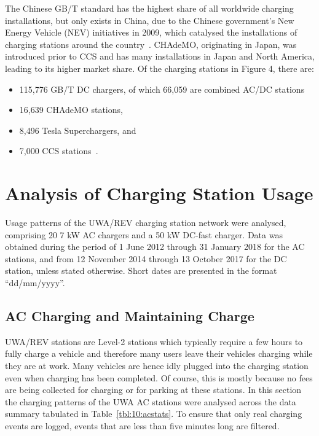 The Chinese GB/T standard has the highest share of all worldwide charging installations, but only exists in China, due to the Chinese government’s New Energy Vehicle (NEV) initiatives in 2009, which catalysed the installations of charging stations around the country~\cite{ji_plug-electric_2018}. CHAdeMO, originating in Japan, was introduced prior to CCS and has many installations in Japan and North America, leading to its higher market share. Of the charging stations in Figure 4, there are:
\begin{itemize}
	\item 115,776 GB/T DC chargers, of which 66,059 are combined AC/DC stations~\cite{china_electric_vehicle_charging_infrastructure_promotion_alliance_zhongguo_2017}
	\item 16,639 CHAdeMO stations,
	\item 8,496 Tesla Superchargers, and
	\item 7,000 CCS stations~\cite{steitz_plug_2018}.
\end{itemize}


\section{Analysis of Charging Station Usage}
\label{sec:10:analysis}
Usage patterns of the UWA/REV charging station network were analysed, comprising 20 7 kW AC chargers and a 50 kW DC-fast charger. Data was obtained during the period of 1 June 2012 through 31 January 2018 for the AC stations, and from 12 November 2014 through 13 October 2017 for the DC station, unless stated otherwise. Short dates are presented in the format ``dd/mm/yyyy''.

\subsection{AC Charging and Maintaining Charge}
\label{sec:10:ac}
UWA/REV stations are Level-2 stations which typically require a few hours to fully charge a vehicle and therefore many users leave their vehicles charging while they are at work. Many vehicles are hence idly plugged into the charging station even when charging has been completed. Of course, this is mostly because no fees are being collected for charging or for parking at these stations. In this section the charging patterns of the UWA AC stations were analysed across the data summary tabulated in Table~\ref{tbl:10:acstats}. To ensure that only real charging events are logged, events that are less than five minutes long are filtered.

